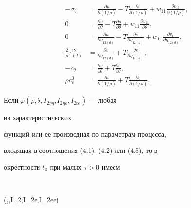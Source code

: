 \begin{equation}


\begin{split}


-\sigma_0&=\frac{\partial u}{\partial(1/\rho )}-


T\frac{\partial s}{\partial(1/\rho )}+


w_{11}\frac{\partial v_{11}}{\partial(1/\rho )},\\


0&=\frac{\partial u}{\partial\theta}-


T\frac{\partial s}{\partial\theta}+w_{11}


\frac{\partial v_{11}}{\partial\theta},\\


0&=\frac{\partial u}{\partial\eta_{12(d)}}-


T\frac{\partial s}{\partial\eta_{12(d)}}+w_{11}


\frac{\partial v_{11}}{\partial\eta_{12(d)}},\\


\frac{2}{\rho }\tau^{12}_{(d)}&=


\frac{\partial v}{\partial\eta_{12(d)}}+


T\frac{\partial s}{\partial\eta_{12(d)}},\\


-c_\theta&=\frac{\partial v}{\partial\theta}+


T\frac{\partial s}{\partial\theta},\\


\rho  c^0_\varepsilon&=\frac{\partial v}{\partial(1/\rho )}+


T\frac{\partial s}{\partial(1/\rho )}.


\end{split}


\tag{4.5}


\end{equation}





Если $\varphi(\rho ,\theta,I_{2\eta\eta},I_{2\eta e},I_{2ee})$ --- любая


из характеристических


функций или ее производная по параметрам процесса,


входящая в соотношения (4.1), (4.2) или (4.5), то в


окрестности $t_0$ при малых $\tau>0$ имеем


$$


\varphi(\rho ,\theta,I_{2\eta\eta},I_{2\eta e},I_{2ee})\simeq


